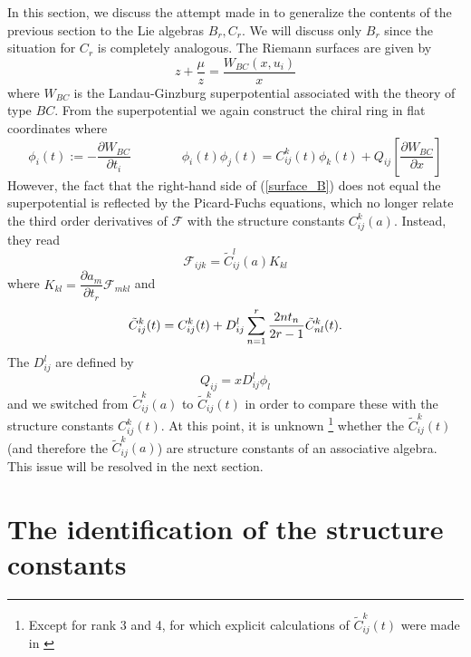 \documentclass[a4paper,11pt]{article}
\numberwithin{equation}{section}
\begin{document}
In this section, we discuss the attempt made in \cite{ITO-YANG:1998} to
generalize the contents of the previous section to the Lie algebras $%
B_{r},C_{r}$. We will discuss only $B_{r}$ since the situation for $C_{r}$
is completely analogous. The Riemann surfaces are given by 
\begin{equation}
z+\dfrac{\mu }{z}=\dfrac{W_{BC}(x,u_{i})}{x}  \label{surface_B}
\end{equation}
where $W_{BC}$ is the Landau-Ginzburg superpotential associated with the
theory of type $BC$. From the superpotential we again construct the chiral
ring in flat coordinates where 
\begin{equation}
\phi _{i}(t):=-\dfrac{\partial W_{BC}}{\partial t_{i}}\qquad \qquad \phi
_{i}(t)\phi _{j}(t)=C_{ij}^{k}(t)\phi _{k}(t)+Q_{ij}\left[ \dfrac{\partial
W_{BC}}{\partial x}\right] 
\label{chiralB}
\end{equation}
However, the fact that the right-hand side of (\ref{surface_B}) does not
equal the superpotential is reflected by the Picard-Fuchs equations, which
no longer relate the third order derivatives of $\mathcal{F}$ with the
structure constants $C_{ij}^{k}(a)$. Instead, they read 
\begin{equation}
\mathcal{F}_{ijk}=\tilde{C}_{ij}^{l}(a)K_{kl}
\end{equation}
where $K_{kl}=\dfrac{\partial a_{m}}{\partial t_{r}}\mathcal{F}_{mkl}$ and 
\begin{equation}
\tilde{C}_{ij}^{k}(t)=C_{ij}^{k}(t)+D_{ij}^{l}\sum_{n=1}^{r}\dfrac{2nt_{n}}{%
2r-1}\tilde{C}_{nl}^{k}(t).  \label{Ctilde}
\end{equation}
The $D_{ij}^{l}$ are defined by 
\begin{equation}
Q_{ij}=xD_{ij}^{l}\phi _{l}  \label{D}
\end{equation}
and we switched from $\tilde{C}_{ij}^{k}(a)$ to $\tilde{C}_{ij}^{k}(t)$ in order to compare these with
the structure constants $C_{ij}^{k}(t)$. At this point, it is unknown%
\footnote{%
Except for rank 3 and 4, for which explicit calculations of $\tilde{C}%
_{ij}^{k}(t)$ were made in \cite{ITO-YANG:1998}} whether the $\tilde{C}%
_{ij}^{k}(t)$ (and therefore the $\tilde{C}_{ij}^{k}(a)$) are structure
constants of an associative algebra. This issue will be resolved in the next
section.

\section{The identification of the structure constants}
\end{document}
